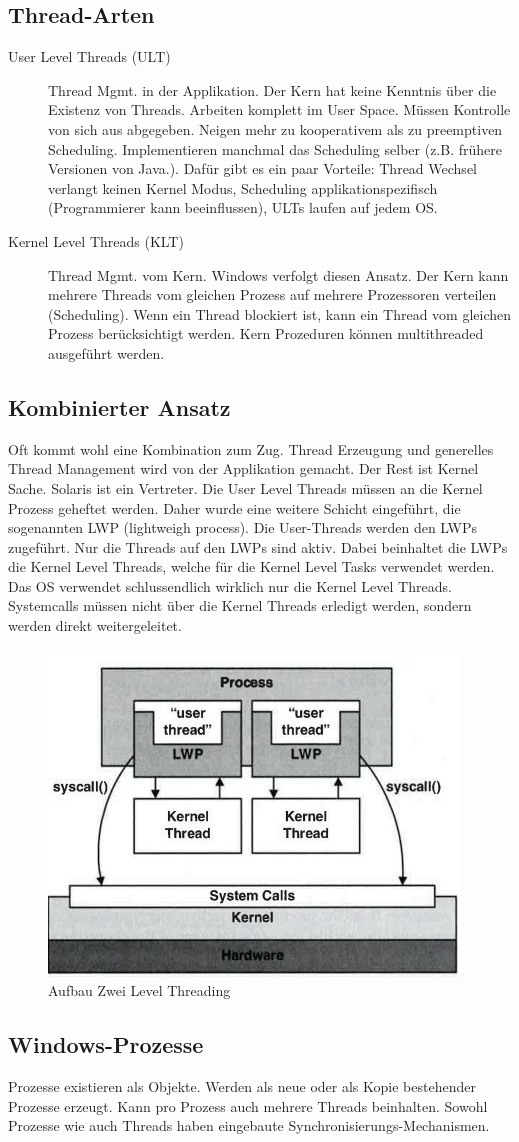 \subsection{Thread-Arten}
\begin{description}
	\item[User Level Threads (ULT)]
	Thread Mgmt. in der Applikation. Der Kern hat keine Kenntnis über die Existenz von Threads. Arbeiten komplett im User Space. Müssen Kontrolle von sich aus abgegeben. Neigen mehr zu kooperativem als zu preemptiven Scheduling. Implementieren manchmal das Scheduling selber (z.B. frühere Versionen von Java.).
	Dafür gibt es ein paar Vorteile: Thread Wechsel verlangt keinen Kernel Modus, Scheduling applikationspezifisch (Programmierer kann beeinflussen), ULTs laufen auf jedem OS.
	\item[Kernel Level Threads (KLT)]
	Thread Mgmt. vom Kern. Windows verfolgt diesen Ansatz. Der Kern kann mehrere Threads vom gleichen Prozess auf mehrere Prozessoren verteilen (Scheduling). Wenn ein Thread blockiert ist, kann ein Thread vom gleichen Prozess berücksichtigt werden. Kern Prozeduren können multithreaded ausgeführt werden.
\end{description}

\subsection{Kombinierter Ansatz}
Oft kommt wohl eine Kombination zum Zug. Thread Erzeugung und generelles Thread Management wird von der Applikation gemacht. Der Rest ist Kernel Sache. Solaris ist ein Vertreter. Die User Level Threads müssen an die Kernel Prozess geheftet werden. Daher wurde eine weitere Schicht eingeführt, die sogenannten LWP (lightweigh process). Die User-Threads werden den LWPs zugeführt. Nur die Threads auf den LWPs sind aktiv. Dabei beinhaltet die LWPs die Kernel Level Threads, welche für die Kernel Level Tasks verwendet werden. Das OS verwendet schlussendlich wirklich nur die Kernel Level Threads. Systemcalls müssen nicht über die Kernel Threads erledigt werden, sondern werden direkt weitergeleitet.

\begin{figure}[h!]
\centering
\includegraphics[width=0.7\linewidth]{fig/system-software-aufbau-2-level-threading}
\caption{Aufbau Zwei Level Threading}
\label{fig:system-software-aufbau-2-level-threading}
\end{figure}

\subsection{Windows-Prozesse}
Prozesse existieren als Objekte. Werden als neue oder als Kopie bestehender Prozesse erzeugt. Kann pro Prozess auch mehrere Threads beinhalten. Sowohl Prozesse wie auch Threads haben eingebaute Synchronisierungs-Mechanismen.
